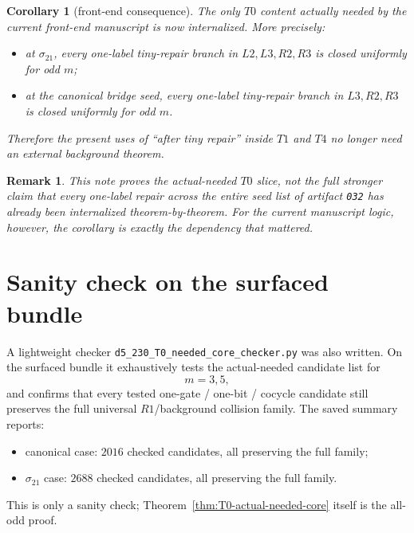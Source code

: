 \documentclass[11pt]{article}
\newtheorem{corollary}{Corollary}
\newtheorem{remark}{Remark}
\begin{document}
\begin{corollary}[front-end consequence]
\label{cor:no-remaining-T0-dependency}
The only $T0$ content actually needed by the current front-end manuscript is now
internalized.
More precisely:
\begin{itemize}
\item at $\sigma_{21}$, every one-label tiny-repair branch in
$L2,L3,R2,R3$ is closed uniformly for odd $m$;
\item at the canonical bridge seed, every one-label tiny-repair branch in
$L3,R2,R3$ is closed uniformly for odd $m$.
\end{itemize}
Therefore the present uses of ``after tiny repair'' inside $T1$ and $T4$ no longer
need an external background theorem.
\end{corollary}

\begin{remark}
This note proves the \emph{actual-needed} $T0$ slice, not the full stronger claim
that every one-label repair across the entire seed list of artifact \texttt{032} has
already been internalized theorem-by-theorem.
For the current manuscript logic, however, the corollary is exactly the dependency
that mattered.
\end{remark}

\section*{Sanity check on the surfaced bundle}
A lightweight checker
\texttt{d5\_230\_T0\_needed\_core\_checker.py} was also written.
On the surfaced bundle it exhaustively tests the actual-needed candidate list for
\[
m=3,5,
\]
and confirms that every tested one-gate / one-bit / cocycle candidate still
preserves the full universal $R1$/background collision family.
The saved summary reports:
\begin{itemize}
\item canonical case: $2016$ checked candidates, all preserving the full family;
\item $\sigma_{21}$ case: $2688$ checked candidates, all preserving the full family.
\end{itemize}
This is only a sanity check; Theorem~\ref{thm:T0-actual-needed-core} itself is the
all-odd proof.
\end{document}
